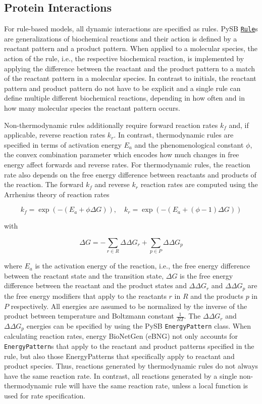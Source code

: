 \documentclass[11pt]{article}
\begin{document}
    \hypertarget{protein-interactions}{%
\subsection{Protein Interactions}\label{protein-interactions}}

For rule-based models, all dynamic interactions are specified as rules.
PySB
\href{https://pysb.readthedocs.io/en/stable/modules/core.html\#pysb.core.Rule}{\texttt{Rule}}s
are generalizations of biochemical reactions and their action is defined
by a reactant pattern and a product pattern. When applied to a molecular
species, the action of the rule, i.e., the respective biochemical
reaction, is implemented by applying the difference between the reactant
and the product pattern to a match of the reactant pattern in a
molecular species. In contrast to initials, the reactant pattern and
product pattern do not have to be explicit and a single rule can define
multiple different biochemical reactions, depending in how often and in
how many molecular species the reactant pattern occurs.

Non-thermodynamic rules additionally require forward reaction rates
\(k_f\) and, if applicable, reverse reaction rates \(k_r\). In contrast,
thermodynamic rules are specified in terms of activation energy \(E_a\)
and the phenomenological constant \(\phi\), the convex combination
parameter which encodes how much changes in free energy affect forwards
and reverse rates. For thermodynamic rules, the reaction rate also
depends on the free energy difference between reactants and products of
the reaction. The forward \(k_f\) and reverse \(k_r\) reaction rates are
computed using the Arrhenius theory of reaction rates

\[k_f=\exp( - (E_a + \phi \Delta G)), \quad k_r=\exp( - (E_a + (\phi - 1) \Delta G))\]

with

\[\Delta G = - \sum_{r \in R} \Delta \Delta G_r + \sum_{p \in P} \Delta \Delta G_p\]

where \(E_a\) is the activation energy of the reaction, i.e., the free
energy difference between the reactant state and the transition state,
\(\Delta G\) is the free energy difference between the reactant and the
product states and \(\Delta \Delta G_r\) and \(\Delta \Delta G_p\) are
the free energy modifiers that apply to the reactants \(r\) in \(R\) and
the products \(p\) in \(P\) respectively. All energies are assumed to be
normalized by the inverse of the product between temperature and
Boltzmann constant \(\frac{1}{RT}\). The \(\Delta \Delta G_r\) and
\(\Delta \Delta G_p\) energies can be specified by using the PySB
\texttt{EnergyPattern} class. When calculating reaction rates, energy
BioNetGen (eBNG) not only accounts for \texttt{EnergyPattern}s that
apply to the reactant and product patterns specified in the rule, but
also those EnergyPatterns that specifically apply to reactant and
product species. Thus, reactions generated by thermodynamic rules do not
always have the same reaction rate. In contrast, all reactions generated
by a single non-thermodynamic rule will have the same reaction rate,
unless a local function is used for rate specification.
\end{document}
